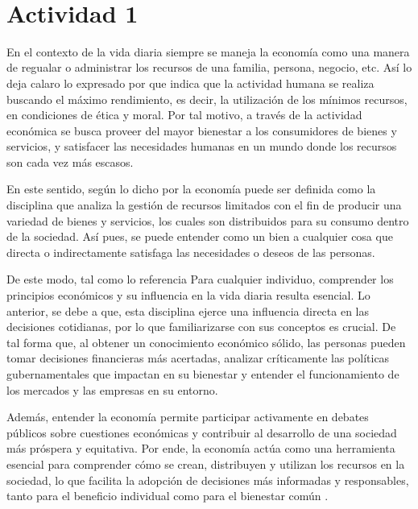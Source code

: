 
\justify
\fontsize{12pt}{14}\
\setlength{\parindent}{0cm}

\section{Actividad 1}
\normalsize En el contexto de la vida diaria siempre se maneja la economía como una manera de regualar o administrar los recursos de una familia, persona, negocio, etc. Así lo deja calaro lo expresado por \cite{pereira2011} que indica que la actividad humana se realiza buscando el máximo rendimiento, es decir, la utilización de los mínimos recursos, en condiciones de ética y moral. Por tal motivo, a través de la actividad económica se busca proveer del mayor bienestar a los consumidores de bienes y servicios, y satisfacer las necesidades humanas en un mundo donde los recursos son cada vez más escasos.

\normalsize En este sentido, según lo dicho por \cite{llorca2016} la economía puede ser definida como la disciplina que analiza la gestión de recursos limitados con el fin de producir una variedad de bienes y servicios, los cuales son distribuidos para su consumo dentro de la sociedad. Así pues, se puede entender como un bien a cualquier cosa que directa o indirectamente satisfaga las necesidades o deseos de las personas.

\normalsize De este modo, tal como lo referencia \cite{euroinnova2023} Para cualquier individuo, comprender los principios económicos y su influencia en la vida diaria resulta esencial. Lo anterior, se debe a que, esta disciplina ejerce una influencia directa en las decisiones cotidianas, por lo que familiarizarse con sus conceptos es crucial. De tal forma que, al obtener un conocimiento económico sólido, las personas pueden tomar decisiones financieras más acertadas, analizar críticamente las políticas gubernamentales que impactan en su bienestar y entender el funcionamiento de los mercados y las empresas en su entorno.

\normalsize Además, entender la economía permite participar activamente en debates públicos sobre cuestiones económicas y contribuir al desarrollo de una sociedad más próspera y equitativa. Por ende, la economía actúa como una herramienta esencial para comprender cómo se crean, distribuyen y utilizan los recursos en la sociedad, lo que facilita la adopción de decisiones más informadas y responsables, tanto para el beneficio individual como para el bienestar común \parencite{euroinnova2023}.

